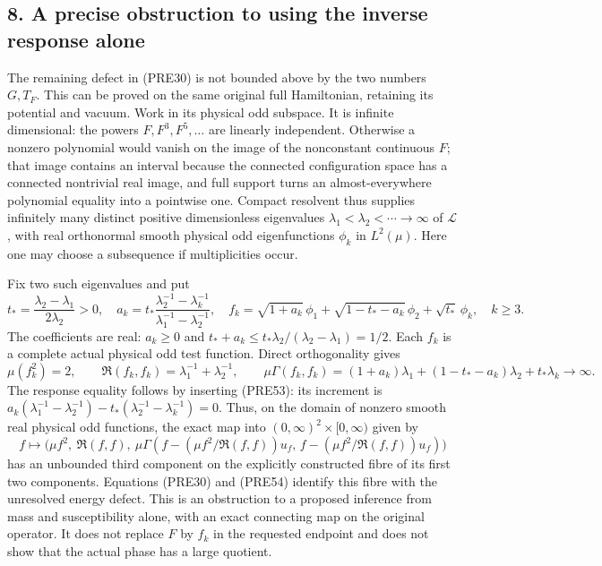 \documentclass[11pt]{article}
\begin{document}
\subsection*{8. A precise obstruction to using the inverse response alone}

The remaining defect in (PRE30) is not bounded above by the two numbers \(G,T_F\). This can be proved on the same original full Hamiltonian, retaining its potential and vacuum. Work in its physical odd subspace. It is infinite dimensional: the powers \(F,F^3,F^5,\ldots\) are linearly independent. Otherwise a nonzero polynomial would vanish on the image of the nonconstant continuous \(F\); that image contains an interval because the connected configuration space has a connected nontrivial real image, and full support turns an almost-everywhere polynomial equality into a pointwise one. Compact resolvent thus supplies infinitely many distinct positive dimensionless eigenvalues
\(\lambda_1<\lambda_2<\cdots\to\infty\) of \(\mathcal L\), with real orthonormal smooth physical odd eigenfunctions \(\phi_k\) in \(L^2(\mu)\). Here one may choose a subsequence if multiplicities occur.

Fix two such eigenvalues and put
\[
 t_*=\frac{\lambda_2-\lambda_1}{2\lambda_2}>0,\quad
 a_k=t_*\frac{\lambda_2^{-1}-\lambda_k^{-1}}
                    {\lambda_1^{-1}-\lambda_2^{-1}},\quad
 f_k=\sqrt{1+a_k}\,\phi_1
       +\sqrt{1-t_*-a_k}\,\phi_2+\sqrt{t_*}\,\phi_k,\quad k\ge3.
 \tag{PRE53}
\]
The coefficients are real: \(a_k\ge0\) and
\(t_*+a_k\le t_*\lambda_2/(\lambda_2-\lambda_1)=1/2\).
Each \(f_k\) is a complete actual physical odd test function. Direct orthogonality gives
\[
 \mu(f_k^2)=2,\qquad
 \mathfrak R(f_k,f_k)=\lambda_1^{-1}+\lambda_2^{-1},\qquad
 \mu\Gamma(f_k,f_k)
   =(1+a_k)\lambda_1+(1-t_*-a_k)\lambda_2+t_*\lambda_k
       \longrightarrow\infty.
 \tag{PRE54}
\]
The response equality follows by inserting (PRE53): its increment is
\(a_k(\lambda_1^{-1}-\lambda_2^{-1})
-t_*(\lambda_2^{-1}-\lambda_k^{-1})=0\).
Thus, on the domain of nonzero smooth real physical odd functions, the exact map into \((0,\infty)^2\times[0,\infty)\) given by
\[
 f\longmapsto
 \bigl(\mu f^2,\ \mathfrak R(f,f),\
             \mu\Gamma(f-(\mu f^2/\mathfrak R(f,f))u_f,\,
                         f-(\mu f^2/\mathfrak R(f,f))u_f)\bigr)
 \tag{PRE55}
\]
has an unbounded third component on the explicitly constructed fibre of its first two components. Equations (PRE30) and (PRE54) identify this fibre with the unresolved energy defect. This is an obstruction to a proposed inference from mass and susceptibility alone, with an exact connecting map on the original operator. It does not replace \(F\) by \(f_k\) in the requested endpoint and does not show that the actual phase has a large quotient.
\end{document}
